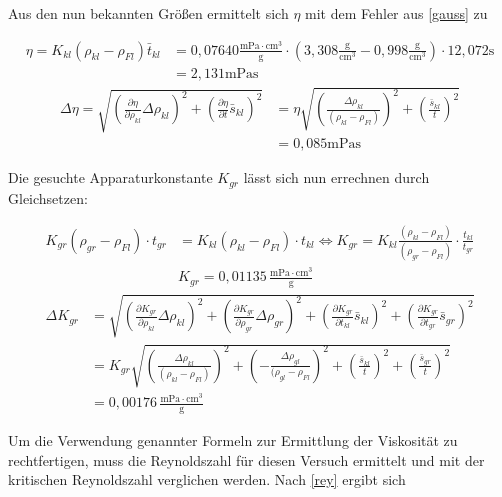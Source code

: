 Aus den nun bekannten Größen ermittelt sich $\eta$ mit dem Fehler aus \eqref{gauss} zu

\begin{align}
 \nonumber
 \eta = K_{kl}(\rho_{kl}-\rho_{Fl}) \bar t_{kl} &= 0,07640 \frac{\text{mPa}\cdot\text{cm}^3}{\text{g}} \cdot \left(3,308\frac{\text{g}}{\text{cm$^3$}} - 0,998 \frac{\text{g}}{\text{cm$^3$}}\right)\cdot 12,072 \text{s}\\
 &= 2,131 \text{mPas}
\end{align}
\begin{align}
\nonumber
 \Delta \eta = \sqrt{\left(\frac{\partial \eta}{\partial \rho_{kl}}\Delta \rho_{kl}\right)^2 + \left(\frac{\partial \eta}{\partial t} \bar s_{kl}\right)^2} &= \eta \sqrt{\left(\frac{\Delta \rho_{kl}}{(\rho_{kl}-\rho_{Fl})}\right)^2 + \left(\frac{\bar s_{kl}}{t}\right)^2} \\
 &= 0,085 \text{mPas}
\end{align}

Die gesuchte Apparaturkonstante $K_{gr}$ lässt sich nun errechnen durch Gleichsetzen:

\begin{align}
 \nonumber
 K_{gr}(\rho_{gr} - \rho_{Fl})\cdot t_{gr} &= K_{kl}(\rho_{kl} - \rho_{Fl})\cdot t_{kl} \Leftrightarrow K_{gr} = K_{kl}\frac{(\rho_{kl} - \rho_{Fl})}{(\rho_{gr} - \rho_{Fl})}\cdot\frac{t_{kl}}{t_{gr}}\\
 &K_{gr} = 0,01135\, \frac{\text{mPa}\cdot\text{cm}^3}{\text{g}}
\end{align}
\begin{align}
 \nonumber
\Delta K_{gr} &= \sqrt{\left(\frac{\partial K_{gr}}{\partial \rho_{kl}}\Delta \rho_{kl} \right)^2 + \left(\frac{\partial K_{gr}}{\partial \rho_{gr}}\Delta \rho_{gr} \right)^2 + \left(\frac{\partial K_{gr}}{\partial t_{kl}} \bar s_{kl} \right)^2 + \left(\frac{\partial K_{gr}}{\partial t_{gr}} \bar s_{gr} \right)^2}\\
 \nonumber
 &= K_{gr} \sqrt{\left(\frac{\Delta \rho_{kl}}{(\rho_{kl}-\rho_{Fl})} \right)^2 + \left(-\frac{\Delta \rho_{gl}}{(\rho_{gl}-\rho_{Fl}} \right)^2 + \left(\frac{\bar s_{kl}}{t} \right)^2 + \left(\frac{\bar s_{gr}}{t} \right)^2}\\
 &= 0,00176 \, \frac{\text{mPa}\cdot\text{cm}^3}{\text{g}}
\end{align}


Um die Verwendung genannter Formeln zur Ermittlung der Viskosität zu rechtfertigen, muss die Reynoldszahl für diesen Versuch ermittelt und mit 
der kritischen Reynoldszahl verglichen werden. Nach \eqref{rey} ergibt sich

